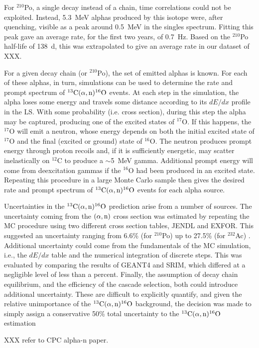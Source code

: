 \documentclass[../thesis.tex]{subfiles}
\begin{document}
For $^{210}$Po, a single decay instead of a chain, time correlations could not
be exploited. Instead, 5.3~MeV alphas produced by this isotope were, after
quenching, visible as a peak around 0.5~MeV in the singles spectrum. Fitting
this peak gave an average rate, for the first two years, of 0.7~Hz. Based on the
$^{210}$Po half-life of 138~d, this was extrapolated to give an average rate in
our dataset of XXX.

For a given decay chain (or $^{210}$Po), the set of emitted alphas is known. For
each of these alphas, in turn, simulations can be used to determine the rate and
prompt spectrum of $^{13}\mathrm{C}(\alpha, \mathrm{n})^{16}\mathrm{O}$ events. At each step in the simulation, the alpha
loses some energy and travels some distance according to its $dE/dx$ profile in
the LS. With some probability (i.e. cross section), during this step the alpha
may be captured, producing one of the excited states of $^{17}$O. If this
happens, the $^{17}$O will emit a neutron, whose energy depends on both the
initial excited state of $^{17}$O and the final (excited or ground) state of
$^{16}$O. The neutron produces prompt energy through proton recoils and, if it
is sufficiently energetic, may scatter inelastically on $^{12}$C to produce a
$\sim$5~MeV gamma. Additional prompt energy will come from deexcitation gammas
if the $^{16}$O had been produced in an excited state. Repeating this procedure
in a large Monte Carlo sample then gives the desired rate and prompt spectrum of
$^{13}\mathrm{C}(\alpha, \mathrm{n})^{16}\mathrm{O}$ events for each alpha source.

Uncertainties in the $^{13}\mathrm{C}(\alpha, \mathrm{n})^{16}\mathrm{O}$ prediction arise from a number of sources. The
uncertainty coming from the $(\alpha,\mathrm{n})$ cross section was estimated by repeating
the MC procedure using two different cross section tables, JENDL and EXFOR. This
suggested an uncertainty ranging from 6.6\% (for $^{210}$Po) up to 27.5\% (for
$^{232}$Ac) \cite{Zhao_2014}. Additional uncertainty could come from the
fundamentals of the MC simulation, i.e., the $dE/dx$ table and the numerical
integration of discrete steps. This was evaluated by comparing the results of
GEANT4 and SRIM, which differed at a negligible level of less than a
percent. Finally, the assumption of decay chain equilibrium, and the efficiency
of the cascade selection, both could introduce additional uncertainty. These are
difficult to explicitly quantify, and given the relative unimportance of the
$^{13}\mathrm{C}(\alpha, \mathrm{n})^{16}\mathrm{O}$ background, the decision was made to simply assign a conservative 50\%
total uncertainty to the $^{13}\mathrm{C}(\alpha, \mathrm{n})^{16}\mathrm{O}$ estimation

XXX refer to CPC alpha-n paper.
\end{document}
